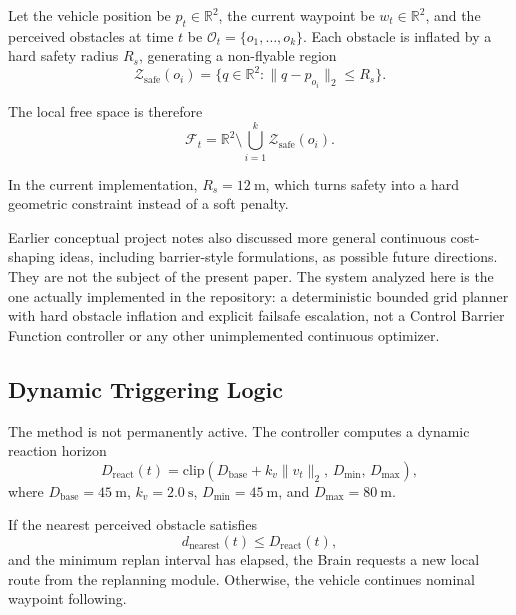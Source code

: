 \documentclass[a4paper,11pt]{article}
\begin{document}
Let the vehicle position be \(p_t \in \mathbb{R}^2\), the current waypoint be \(w_t \in \mathbb{R}^2\), and the perceived obstacles at time \(t\) be \(\mathcal{O}_t = \{o_1,\dots,o_k\}\). Each obstacle is inflated by a hard safety radius \(R_s\), generating a non-flyable region
\begin{equation}
    \mathcal{Z}_{\mathrm{safe}}(o_i) = \{q \in \mathbb{R}^2 : \lVert q - p_{o_i} \rVert_2 \le R_s\}.
\end{equation}

The local free space is therefore
\begin{equation}
    \mathcal{F}_t = \mathbb{R}^2 \setminus \bigcup_{i=1}^{k} \mathcal{Z}_{\mathrm{safe}}(o_i).
\end{equation}

In the current implementation, \(R_s = \SI{12}{\meter}\), which turns safety into a hard geometric constraint instead of a soft penalty.

Earlier conceptual project notes also discussed more general continuous cost-shaping ideas, including barrier-style formulations, as possible future directions. They are not the subject of the present paper. The system analyzed here is the one actually implemented in the repository: a deterministic bounded grid planner with hard obstacle inflation and explicit failsafe escalation, not a Control Barrier Function controller or any other unimplemented continuous optimizer.

\subsection{Dynamic Triggering Logic}

The method is not permanently active. The controller computes a dynamic reaction horizon
\begin{equation}
    D_{\mathrm{react}}(t) =
    \mathrm{clip}\!\left(D_{\mathrm{base}} + k_v \lVert v_t \rVert_2,\,
    D_{\min},\, D_{\max}\right),
\end{equation}
where \(D_{\mathrm{base}}=\SI{45}{\meter}\), \(k_v=\SI{2.0}{\second}\), \(D_{\min}=\SI{45}{\meter}\), and \(D_{\max}=\SI{80}{\meter}\).

If the nearest perceived obstacle satisfies
\begin{equation}
    d_{\mathrm{nearest}}(t) \le D_{\mathrm{react}}(t),
\end{equation}
and the minimum replan interval has elapsed, the Brain requests a new local route from the replanning module. Otherwise, the vehicle continues nominal waypoint following.
\end{document}
